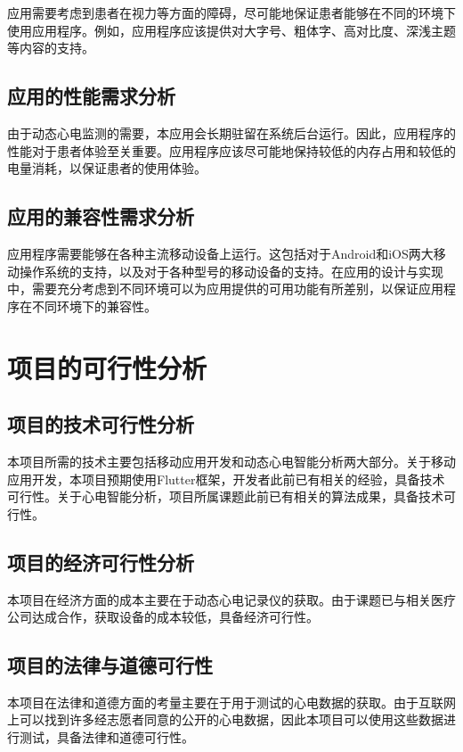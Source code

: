 应用需要考虑到患者在视力等方面的障碍，尽可能地保证患者能够在不同的环境下使用应用程序。例如，应用程序应该提供对大字号、粗体字、高对比度、深浅主题等内容的支持。

\subsection{应用的性能需求分析}\label{subsec:performance}

由于动态心电监测的需要，本应用会长期驻留在系统后台运行。因此，应用程序的性能对于患者体验至关重要。应用程序应该尽可能地保持较低的内存占用和较低的电量消耗，以保证患者的使用体验。

\subsection{应用的兼容性需求分析}\label{subsec:compatibility}

应用程序需要能够在各种主流移动设备上运行。这包括对于Android和iOS两大移动操作系统的支持，以及对于各种型号的移动设备的支持。在应用的设计与实现中，需要充分考虑到不同环境可以为应用提供的可用功能有所差别，以保证应用程序在不同环境下的兼容性。


\section{项目的可行性分析}\label{sec:feasibility}

\subsection{项目的技术可行性分析}\label{subsec:tech-feasibility}

本项目所需的技术主要包括移动应用开发和动态心电智能分析两大部分。关于移动应用开发，本项目预期使用Flutter框架，开发者此前已有相关的经验，具备技术可行性。关于心电智能分析，项目所属课题此前已有相关的算法成果\cite{songDongtaixindiantudezhinengjiancesuanfayanjiuyuyingyong2022}，具备技术可行性。

\subsection{项目的经济可行性分析}\label{subsec:economic-feasibility}

本项目在经济方面的成本主要在于动态心电记录仪的获取。由于课题已与相关医疗公司达成合作，获取设备的成本较低，具备经济可行性。

\subsection{项目的法律与道德可行性}\label{subsec:legal-feasibility}

本项目在法律和道德方面的考量主要在于用于测试的心电数据的获取。由于互联网上可以找到许多经志愿者同意的公开的心电数据，因此本项目可以使用这些数据进行测试，具备法律和道德可行性。
